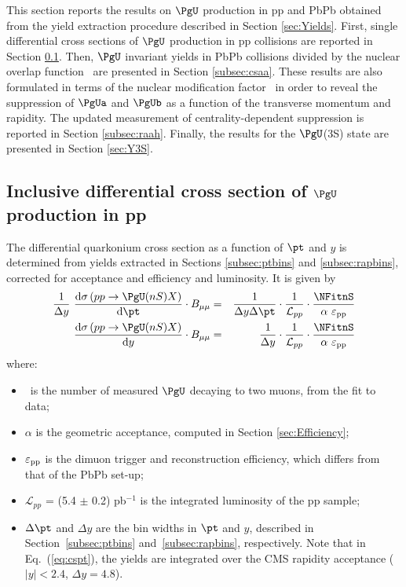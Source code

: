 
This section reports the results on $\PgU$ production in pp and
PbPb obtained from the yield extraction procedure described in Section
\ref{sec:Yields}.
First, single differential cross sections of $\PgU$ production in pp collisions are
reported in Section \ref{subsec:cspp}. Then, $\PgU$ invariant
yields in PbPb collisions divided by the %
 nuclear overlap
function \TAA\ are presented in Section \ref{subsec:csaa}. These
results are also formulated in terms of the nuclear modification
factor \RAA\ in order to reveal the suppression of $\PgUa$ and
$\PgUb$ 
as a function of the transverse momentum and rapidity.
The updated
measurement of centrality-dependent suppression is reported in Section
\ref{subsec:raah}. Finally, the
results for the $\PgU$(3S) state are presented in Section \ref{sec:Y3S}. 

\subsection{Inclusive differential cross section of \texorpdfstring{$\PgU$}{Y} production in pp}
\label{subsec:cspp}
The differential quarkonium cross section as a function of $\pt$ and $y$ is determined from yields extracted in
Sections \ref{subsec:ptbins} and \ref{subsec:rapbins}, corrected for
acceptance and efficiency and luminosity. 
It is given by
\begin{eqnarray} 
\label{eq:cspt}
\dfrac{1}{\Delta y}\ \dfrac{\text{d}\sigma\left( pp\rightarrow \PgU(nS)X\right)}{\text{d}\pt} \cdot B_{\mu\mu} &=& \dfrac{1}{\Delta y \Delta \pt}\cdot\dfrac{1}{\mathcal{L}_{pp}}\cdot\dfrac{\NFitnS}{\alpha\ \varepsilon_{\rm pp} } \\
\label{eq:csrap}
\dfrac{\text{d}\sigma\left( pp\rightarrow
\PgU(nS)X\right)}{\text{d}y} \cdot B_{\mu\mu} &=&
\dfrac{1}{\Delta y}\cdot\dfrac{1}{\mathcal{L}_{pp}}\cdot\dfrac{\NFitnS} {\alpha\ \varepsilon_{\rm pp}} 
\end{eqnarray}
% 
where:
\begin{itemize}
\item{\NFitnS\ is the number of measured $\PgU$ decaying to
two muons, from the fit
to data;}
\item{$\alpha$ is the geometric acceptance, computed in Section
\ref{sec:Efficiency};}
\item{$\varepsilon_{\rm pp}$ is the dimuon trigger and reconstruction
efficiency, which differs from that of the PbPb set-up;}
\item{$\mathcal{L}_{pp}$ = (5.4 $\pm$ 0.2) pb$^{-1}$ is the integrated
luminosity of the pp sample;}
\item{$\Delta \pt$ and $\Delta y$ are the bin widths in $\pt$ and $y$, described in Section~\ref{subsec:ptbins} and~\ref{subsec:rapbins}, respectively. Note that in Eq.~(\ref{eq:cspt})}, the yields are integrated over the CMS rapidity acceptance ($|y|<2.4$, $\Delta y=4.8$).
\end{itemize}

